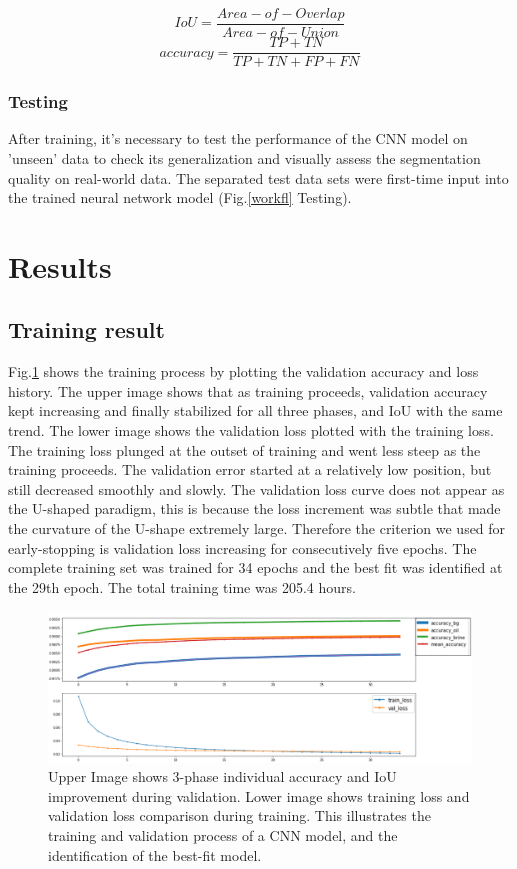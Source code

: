 \documentclass[draft,linenumbers]{agujournal2018}
\begin{document}
\begin{equation}
    IoU=\frac{Area-of-Overlap}{Area-of-Union}
\end{equation}
\begin{equation}
    accuracy=\frac{TP+TN}{TP+TN+FP+FN}
\end{equation}

\subsubsection{Testing}
After training, it's necessary to test the performance of the CNN model on 'unseen' data to check its generalization and visually assess the segmentation quality on real-world data. The separated test data sets were first-time input into the trained neural network model (Fig.\ref{workfl} Testing). 

\section{Results}
\subsection{Training result}
Fig.\ref{crossval} shows the training process by plotting the validation accuracy and loss history. The upper image shows that as training proceeds, validation accuracy kept increasing and finally stabilized for all three phases, and IoU with the same trend. The lower image shows the validation loss plotted with the training loss. The training loss plunged at the outset of training and went less steep as the training proceeds. The validation error started at a relatively low position, but still decreased smoothly and slowly. The validation loss curve does not appear as the U-shaped paradigm, this is because the loss increment was subtle that made the curvature of the U-shape extremely large. Therefore the criterion we used for early-stopping is validation loss increasing for consecutively five epochs. The complete training set was trained for 34 epochs and the best fit was identified at the 29th epoch. The total training time was 205.4 hours. 

\begin{figure}[h]
 \centering
 \includegraphics[width=33pc]{imgs/training_result_23oct.png}
 \caption{Upper Image shows 3-phase individual accuracy and IoU improvement during validation. Lower image shows training loss and validation loss comparison during training. This illustrates the training and validation process of a CNN model, and the identification of the best-fit model.}
 \label{crossval}
 \end{figure}
 
\end{document}
